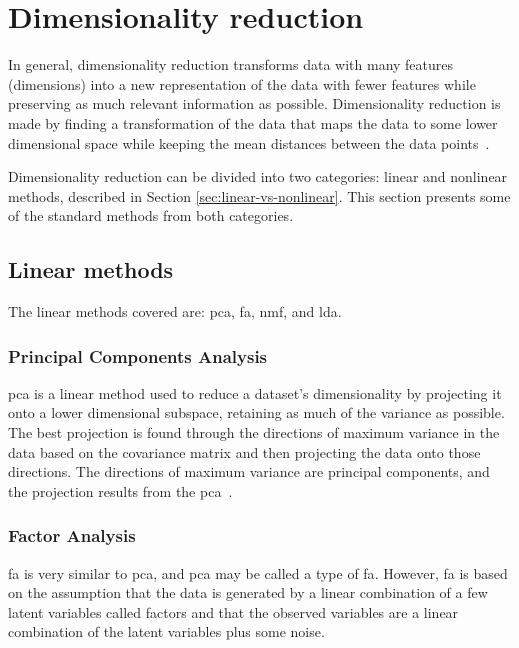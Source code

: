 \section{Dimensionality reduction}\label{sec:dimensionality-reduction}
In general, dimensionality reduction transforms data with many features (dimensions) into a new representation of the data with fewer features while preserving as much relevant information as possible. Dimensionality reduction is made by finding a transformation of the data that maps the data to some lower dimensional space while keeping the mean distances between the data points~\cite{dimensionality-reduction-comparative-review}.

Dimensionality reduction can be divided into two categories: linear and nonlinear methods, described in Section \ref{sec:linear-vs-nonlinear}. This section presents some of the standard methods from both categories.


\subsection{Linear methods}\label{subsec:linear-methods}
The linear methods covered are: \gls{pca}, \gls{fa}, \gls{nmf}, and \gls{lda}.


\subsubsection{Principal Components Analysis}\label{subsubsec:principal-components-analysis}
\gls{pca} is a linear method used to reduce a dataset's dimensionality by projecting it onto a lower dimensional subspace, retaining as much of the variance as possible. The best projection is found through the directions of maximum variance in the data based on the covariance matrix and then projecting the data onto those directions. The directions of maximum variance are principal components, and the projection results from the \gls{pca}~\cite{dimensionality-reduction-comparative-review}.


\subsubsection{Factor Analysis}\label{subsubsec:factor-analysis}
\gls{fa} is very similar to \gls{pca}, and \gls{pca} may be called a type of \gls{fa}. However, \gls{fa} is based on the assumption that the data is generated by a linear combination of a few latent variables called factors and that the observed variables are a linear combination of the latent variables plus some noise.

